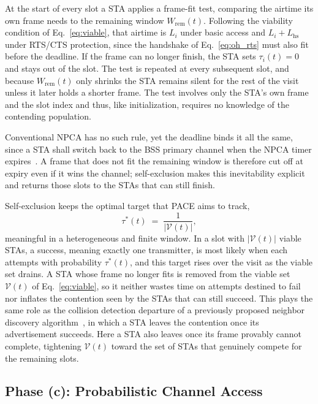 \documentclass[conference]{IEEEtran}
\begin{document}
At the start of every slot a STA applies a frame-fit test, comparing the airtime its own frame needs to the remaining window $W_\mathrm{rem}(t)$. Following the viability condition of Eq.~\eqref{eq:viable}, that airtime is $L_i$ under basic access and $L_i+L_\mathrm{hs}$ under RTS/CTS protection, since the handshake of Eq.~\eqref{eq:oh_rts} must also fit before the deadline. If the frame can no longer finish, the STA sets $\tau_i(t)=0$ and stays out of the slot. The test is repeated at every subsequent slot, and because $W_\mathrm{rem}(t)$ only shrinks the STA remains silent for the rest of the visit unless it later holds a shorter frame. The test involves only the STA's own frame and the slot index and thus, like initialization, requires no knowledge of the contending population.

Conventional NPCA has no such rule, yet the deadline binds it all the same, since a STA shall switch back to the BSS primary channel when the NPCA timer expires~\cite{ieee80211bn}. A frame that does not fit the remaining window is therefore cut off at expiry even if it wins the channel; self-exclusion makes this inevitability explicit and returns those slots to the STAs that can still finish.

Self-exclusion keeps the optimal target that PACE aims to track,
\begin{equation}
    \tau^*(t) \;=\; \frac{1}{|\mathcal{V}(t)|},
    \label{eq:tau_opt}
\end{equation}
meaningful in a heterogeneous and finite window. In a slot with $|\mathcal{V}(t)|$ viable STAs, a success, meaning exactly one transmitter, is most likely when each attempts with probability $\tau^*(t)$, and this target rises over the visit as the viable set drains. A STA whose frame no longer fits is removed from the viable set $\mathcal{V}(t)$ of Eq.~\eqref{eq:viable}, so it neither wastes time on attempts destined to fail nor inflates the contention seen by the STAs that can still succeed. This plays the same role as the collision detection departure of a previously proposed neighbor discovery algorithm~\cite{song2014pnd}, in which a STA leaves the contention once its advertisement succeeds. Here a STA also leaves once its frame provably cannot complete, tightening $\mathcal{V}(t)$ toward the set of STAs that genuinely compete for the remaining slots.

\subsection{Phase (c): Probabilistic Channel Access}
\label{subsec:channel_access}
\end{document}
